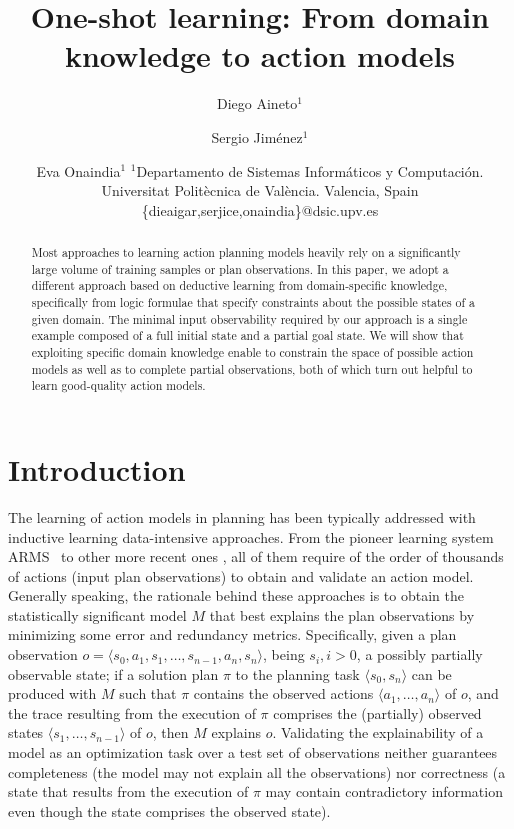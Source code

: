 \documentclass{article}
\title{One-shot learning: From domain knowledge to action models}
\author{
Diego Aineto$^1$\and
Sergio Jim\'enez$^1$\and
Eva Onaindia$^1$
\affiliations
$^1${\small Departamento de Sistemas Inform\'aticos y Computaci\'on. Universitat Polit\`ecnica de Val\`encia. Valencia, Spain}
\emails
{\scriptsize \{dieaigar,serjice,onaindia\}@dsic.upv.es}}
\newcommand{\tup}[1]{{\langle #1 \rangle}}
\newcommand{\ARMS}{{\small {\sffamily ARMS}}\xspace}
\begin{document}
\maketitle


\begin{abstract}
Most approaches to learning action planning models heavily rely on a significantly large volume of training samples or plan observations. In this paper, we adopt a different approach based on deductive learning from domain-specific knowledge, specifically from logic formulae that specify constraints about the possible states of a given domain. The minimal input observability required by our approach is a single example composed of a full initial state and a partial goal state. We will show that exploiting specific domain knowledge enable to constrain the space of possible action models as well as to complete partial observations, both of which turn out helpful to learn good-quality action models.
 \end{abstract}



\section{Introduction}
\label{sec:introduction}

The learning of action models in planning has been typically addressed with inductive learning data-intensive approaches. From the pioneer learning system \ARMS~\cite{yang2007learning} to other more recent ones \cite{MouraoZPS12,zhuo2013action,kuvcera2018louga}, all of them require of the order of thousands of actions (input plan observations) to obtain and validate an action model. Generally speaking, the rationale behind these approaches is to obtain the statistically significant model $M$ that best explains the plan observations by minimizing some error and redundancy metrics. Specifically, given a plan observation $o=\langle s_0,a_1,s_1,\ldots,s_{n-1},a_n,s_n\rangle$, being $s_i, i>0$, a possibly partially observable state; if a solution plan $\pi$ to the planning task $\tup{s_0,s_n}$ can be produced with $M$ such that $\pi$ contains the observed actions $\tup{a_1,\ldots,a_n}$ of $o$, and the trace resulting from the execution of $\pi$ comprises the (partially) observed states $\tup{s_1,\ldots,s_{n-1}}$ of $o$, then $M$ explains $o$. Validating the explainability of a model as an optimization task over a test set of observations neither guarantees completeness (the model may not explain all the observations) nor correctness (a state that results from the execution of $\pi$ may contain contradictory information even though the state comprises the observed state).
\end{document}
